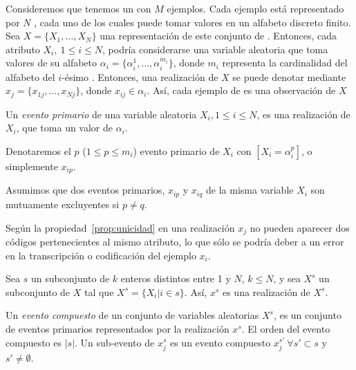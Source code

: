 Consideremos que tenemos un \dataset \D con $M$ ejemplos. Cada ejemplo está representado por $N$ \atributos, cada uno de los cuales puede tomar valores en un alfabeto discreto finito. Sea $X = \{X_1,\ldots,X_N\}$ una representación de este conjunto de \atributos. Entonces, cada atributo $X_i,\ 1\leq i\leq N$, podría considerarse una variable aleatoria que toma valores de su alfabeto $\alpha_i = \{\alpha_i^1,\ldots,\alpha_i^{m_i}\}$, donde $m_i$ representa la cardinalidad del alfabeto del $i$-ésimo \atributo. Entonces, una realización de $X$ se puede denotar mediante $x_j = \{x_{1j},\ldots,x_{Nj}\}$, donde $x_{ij} \in \alpha_i$. Así, cada ejemplo de \D es una observación de $X$

\begin{defn}
   Un \emph{evento primario} de una variable aleatoria $X_i, 1\leq i\leq N$, es una realización de $X_i$, que toma un valor de $\alpha_i$.
\label{def:evento-primario}
\end{defn}

Denotaremos el $p$ ($1\leq p\leq m_i$) evento primario de $X_i$ con $[X_i = \alpha_i^p]$, o simplemente $x_{ip}$. 

\begin{prop}[Unicidad]
   Asumimos que dos eventos primarios, $x_{ip}$ y $x_{iq}$ de la misma variable $X_i$ son mutuamente excluyentes si $p\neq q$.
\label{prop:unicidad}
\end{prop}

Según la propiedad~\ref{prop:unicidad} en una realización $x_j$ no pueden aparecer dos códigos pertenecientes al mismo atributo, lo que sólo se podría deber a un error en la transcripción o codificación del ejemplo $x_i$.

Sea $s$ un subconjunto de $k$ enteros distintos entre 1 y $N$, $k\leq N$, y sea $X^s$ un subconjunto de $X$ tal que $X^s = \{X_i | i\in s\}$. Así, $x^s$ es una realización de $X^s$.

\begin{defn}
   Un \emph{evento compuesto} de un conjunto de variables aleatorias $X^s$, es un conjunto de eventos primarios representados por la realización $x^s$. El orden del evento compuesto es $|s|$. Un sub-evento de $x_j^s$ es un evento compuesto $x_j^{s'}\ \forall s'\subset s$ y $s'\neq\emptyset$.
\label{def:evento-compuesto}
\end{defn}

